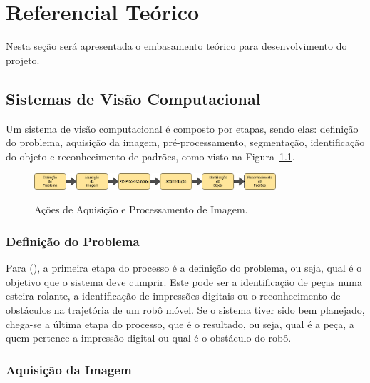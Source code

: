 \chapter{Referencial Teórico}
\label{chap:refteorico}

Nesta seção será apresentada o embasamento teórico para desenvolvimento do projeto.

\section{Sistemas de Visão Computacional}
\label{sec:sistemasVisaoArtificial}

Um sistema de visão computacional é composto por etapas, sendo elas: definição do problema, aquisição da imagem, pré-processamento, segmentação, identificação do objeto e reconhecimento de padrões, como visto na Figura~\ref{fig:acoesProcImagem}.

\begin{figure}[!hbtp]
  \centering
   \caption{Ações de Aquisição e Processamento de Imagem.}
    \includegraphics[width = 0.8\textwidth]{Caps/Figs/ref-teorico/acoes-procImagem.jpg}
   \label{fig:acoesProcImagem}
\end{figure}

\subsection{Definição do Problema}
\label{subsec:defProblema}

Para \citeauthor{rogeralex1999} (\citeyear{rogeralex1999}), a primeira etapa do processo é a definição do problema, ou seja, qual é o objetivo que o sistema deve cumprir. Este pode ser a identificação de peças numa esteira rolante, a identificação de impressões digitais ou o reconhecimento de obstáculos na trajetória de um robô móvel. Se o sistema tiver sido bem planejado, chega-se a última etapa do processo, que é o resultado, ou seja, qual é a peça, a quem pertence a impressão digital ou qual é o obstáculo do robô.

\subsection{Aquisição da Imagem}
\label{subsec:aquisImagem}


